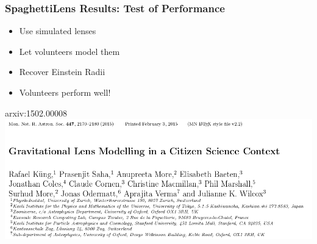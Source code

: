 \documentclass{beamer}
\begin{document}
%
%


 \begin{frame}
   \frametitle{SpaghettiLens Results: Test of Performance}
   \begin{itemize}
     \item Use simulated lenses
     \item Let volunteers model them
     \item Recover Einstein Radii
     \item Volunteers perform well!
   \end{itemize}

   \begin{block}{arxiv:1502.00008}
     \includegraphics[width=\textwidth]{imgs/paper_sl1}
   \end{block}

 \end{frame}
\end{document}
